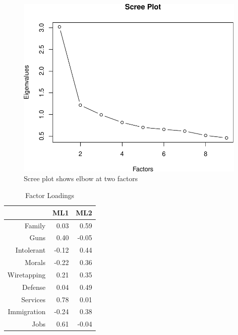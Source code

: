 \documentclass[12pt,]{article}
\begin{document}
\begin{figure}[htbp]
\centering
\includegraphics{figures/scree-1.pdf}
\caption{Scree plot shows elbow at two factors}
\end{figure}

\clearpage

\begin{table}[ht]
\centering
\begin{tabular}{rrr}
  \hline
 & ML1 & ML2 \\ 
  \hline
Family & 0.03 & 0.59 \\ 
  Guns & 0.40 & -0.05 \\ 
  Intolerant & -0.12 & 0.44 \\ 
  Morals & -0.22 & 0.36 \\ 
  Wiretapping & 0.21 & 0.35 \\ 
  Defense & 0.04 & 0.49 \\ 
  Services & 0.78 & 0.01 \\ 
  Immigration & -0.24 & 0.38 \\ 
  Jobs & 0.61 & -0.04 \\ 
   \hline
\end{tabular}
\caption{Factor Loadings} 
\label{Factor Loadings}
\end{table}
\end{document}
